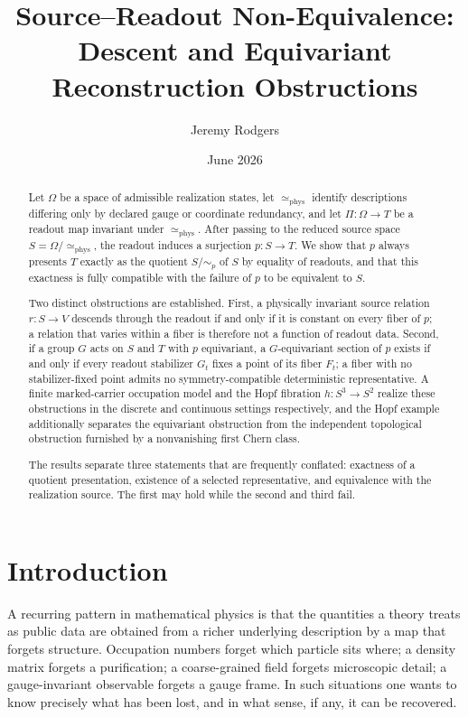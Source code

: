 \documentclass[11pt,reqno]{amsart}
\title[Source--Readout Non-Equivalence]{Source--Readout Non-Equivalence:\\ Descent and Equivariant Reconstruction Obstructions}
\author{Jeremy Rodgers}
\date{June 2026}
\theoremstyle{plain}
\theoremstyle{definition}
\theoremstyle{remark}
\newcommand{\phe}{\simeq_{\mathrm{phys}}}
\newcommand{\Om}{\Omega}
\begin{document}
\begin{abstract}
Let $\Om$ be a space of admissible realization states, let $\phe$ identify descriptions differing only by declared gauge or coordinate redundancy, and let $\Pi\colon\Om\to T$ be a readout map invariant under $\phe$. After passing to the reduced source space $S=\Om/\!\phe$, the readout induces a surjection $p\colon S\to T$. We show that $p$ always presents $T$ exactly as the quotient $S/\!\sim_{p}$ of $S$ by equality of readouts, and that this exactness is fully compatible with the failure of $p$ to be equivalent to $S$.

Two distinct obstructions are established. First, a physically invariant source relation $r\colon S\to V$ descends through the readout if and only if it is constant on every fiber of $p$; a relation that varies within a fiber is therefore not a function of readout data. Second, if a group $G$ acts on $S$ and $T$ with $p$ equivariant, a $G$-equivariant section of $p$ exists if and only if every readout stabilizer $G_{t}$ fixes a point of its fiber $F_{t}$; a fiber with no stabilizer-fixed point admits no symmetry-compatible deterministic representative. A finite marked-carrier occupation model and the Hopf fibration $h\colon S^{3}\to S^{2}$ realize these obstructions in the discrete and continuous settings respectively, and the Hopf example additionally separates the equivariant obstruction from the independent topological obstruction furnished by a nonvanishing first Chern class.

The results separate three statements that are frequently conflated: exactness of a quotient presentation, existence of a selected representative, and equivalence with the realization source. The first may hold while the second and third fail.
\end{abstract}

\maketitle

\section{Introduction}
\label{sec:intro}

A recurring pattern in mathematical physics is that the quantities a theory treats as public data are obtained from a richer underlying description by a map that forgets structure. Occupation numbers forget which particle sits where; a density matrix forgets a purification; a coarse-grained field forgets microscopic detail; a gauge-invariant observable forgets a gauge frame. In such situations one wants to know precisely what has been lost, and in what sense, if any, it can be recovered.
\end{document}
